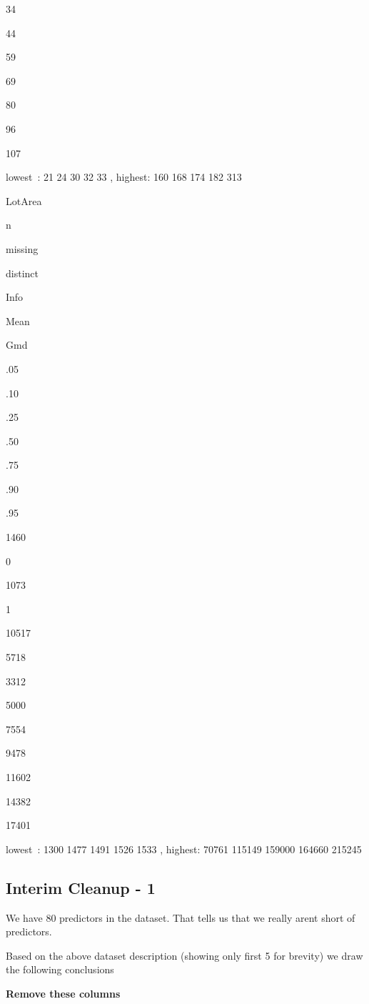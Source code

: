 \documentclass[
]{article}
\begin{document}
34

44

59

69

80

96

107

{lowest~: 21 24 30 32 33 , highest: 160 168 174 182 313}

{LotArea}

n

missing

distinct

Info

Mean

Gmd

.05

.10

.25

.50

.75

.90

.95

1460

0

1073

1

10517

5718

3312

5000

7554

9478

11602

14382

17401

{lowest~: 1300 1477 1491 1526 1533 , highest: 70761 115149 159000 164660 215245}

\hypertarget{interim-cleanup---1}{%
\subsection{Interim Cleanup - 1}\label{interim-cleanup---1}}

We have 80 predictors in the dataset. That tells us that we really arent short of predictors.

Based on the above dataset description (showing only first 5 for brevity) we draw the following conclusions

\textbf{Remove these columns}
\end{document}

